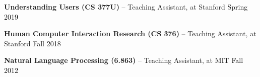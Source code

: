 
\textbf{Understanding Users (CS 377U)} -- Teaching Assistant, at Stanford \hfill \textcolor{black}{Spring 2019}

\textbf{Human Computer Interaction Research (CS 376)} -- Teaching Assistant, at Stanford \hfill \textcolor{black}{Fall 2018}

\textbf{Natural Language Processing (6.863)} -- Teaching Assistant, at MIT \hfill \textcolor{black}{Fall 2012}\\







